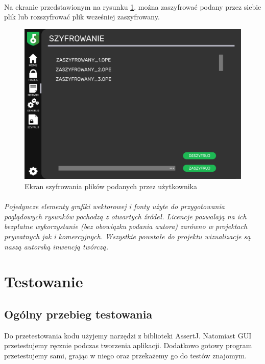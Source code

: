 \documentclass[a4paper]{article}
\begin{document}
\newpage

\paragraph{}Na ekranie przedstawionym na rysunku \ref{fig:szyfrowanie}. można zaszyfrować podany przez siebie plik lub rozszyfrować plik wcześniej zaszyfrowany.
\begin{figure}[H]
    \centering
    \includegraphics[width=1\textwidth]{img/ekran_szyfrowania.png}
    \caption{Ekran szyfrowania plików podanych przez użytkownika}
    \label{fig:szyfrowanie}
\end{figure}

\paragraph{}\textit{Pojedyncze elementy grafiki wektorowej i fonty użyte do przygotowania poglądowych rysunków pochodzą z otwartych źródeł. Licencje pozwalają na ich bezpłatne wykorzystanie (bez obowiązku podania autora) zarówno w projektach prywatnych jak i komercyjnych. Wszystkie powstałe do projektu wizualizacje są naszą autorską inwencją twórczą.}

\section{Testowanie}
\subsection{Ogólny przebieg testowania}
Do przetestowania kodu użyjemy narzędzi z biblioteki AssertJ. Natomiast GUI przetestujemy ręcznie podczas tworzenia aplikacji. Dodatkowo gotowy program przetestujemy sami, grając w niego oraz przekażemy go do testów znajomym.
\label{end}
\end{document}

